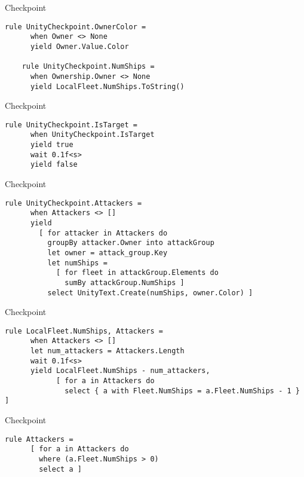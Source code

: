 \documentclass{beamer}
\begin{document}
\begin{frame}[fragile]{Checkpoint}
\begin{lstlisting}[frame=shadowbox]
    rule UnityCheckpoint.OwnerColor =
      when Owner <> None
      yield Owner.Value.Color

    rule UnityCheckpoint.NumShips =
      when Ownership.Owner <> None
      yield LocalFleet.NumShips.ToString()
\end{lstlisting}
\end{frame}

\begin{frame}[fragile]{Checkpoint}
\begin{lstlisting}[frame=shadowbox]
    rule UnityCheckpoint.IsTarget =
      when UnityCheckpoint.IsTarget
      yield true
      wait 0.1f<s>
      yield false
\end{lstlisting}
\end{frame}

\begin{frame}[fragile]{Checkpoint}
\begin{lstlisting}[frame=shadowbox]
    rule UnityCheckpoint.Attackers =
      when Attackers <> []
      yield 
        [ for attacker in Attackers do
          groupBy attacker.Owner into attackGroup
          let owner = attack_group.Key
          let numShips = 
            [ for fleet in attackGroup.Elements do 
              sumBy attackGroup.NumShips ]
          select UnityText.Create(numShips, owner.Color) ]
\end{lstlisting}
\end{frame}

\begin{frame}[fragile]{Checkpoint}
\begin{lstlisting}[frame=shadowbox]
    rule LocalFleet.NumShips, Attackers =
      when Attackers <> []
      let num_attackers = Attackers.Length
      wait 0.1f<s>
      yield LocalFleet.NumShips - num_attackers,
            [ for a in Attackers do
              select { a with Fleet.NumShips = a.Fleet.NumShips - 1 } ]
\end{lstlisting}
\end{frame}

\begin{frame}[fragile]{Checkpoint}
\begin{lstlisting}[frame=shadowbox]
    rule Attackers =
      [ for a in Attackers do
        where (a.Fleet.NumShips > 0)
        select a ]
\end{lstlisting}
\end{frame}
\end{document}
